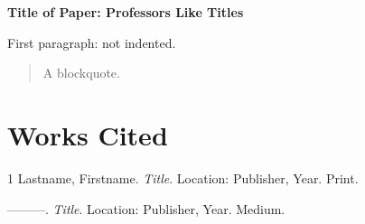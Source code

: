 \documentclass[12pt]{article}
\newcommand{\threeEmDash}{---------}
\begin{document}
\thispagestyle{plain}

\begin{center}
\textbf{Title of Paper: Professors Like Titles}
\end{center}

\noindent First paragraph: not indented.


\begin{quote}
A blockquote.
\end{quote}


\section{Works Cited}

\begin{hangparas}{\parindent}{1}
Lastname, Firstname. \emph{Title}. Location: Publisher, Year. Print.

\threeEmDash. \emph{Title}. Location: Publisher, Year. Medium.
\end{hangparas}

\end{document}
